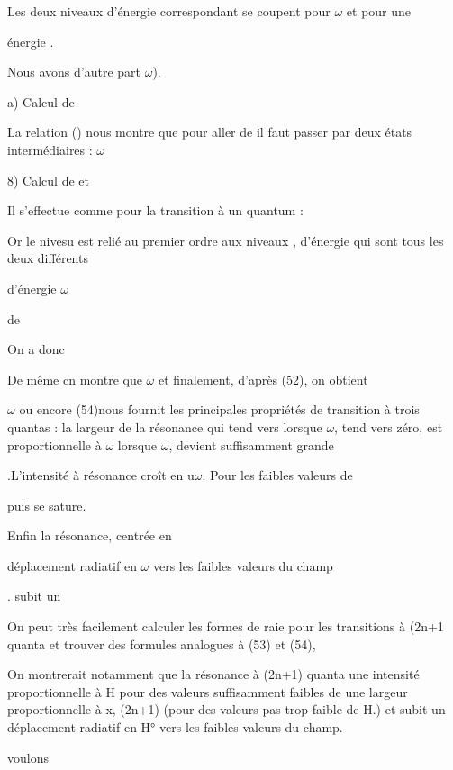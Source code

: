 Les deux niveaux d'énergie correspondant se coupent pour $\omega$ et pour une

énergie .

Nous avons d'autre part $\omega$).

a) Calcul de 

La relation () nous montre que pour aller de 
il faut passer par deux états intermédiaires :
$\omega$

8) Calcul de  et 

Il s'effectue comme pour la transition à un quantum :


Or le nivesu  est relié au premier ordre aux
niveaux , d'énergie  qui sont tous les deux différents

d'énergie $\omega$

de

On a donc

De même cn montre que
$\omega$
et finalement, d'après (52), on obtient

$\omega$
ou encore
(54)nous fournit les principales propriétés de  transition à trois quantas :
la largeur de la résonance  qui tend vers  lorsque
$\omega$, tend vers zéro, est proportionnelle à $\omega$  lorsque $\omega$, devient suffisamment grande


.L'intensité à résonance croît en u$\omega$. Pour les faibles valeurs de

puis se sature.

Enfin la résonance, centrée en 

déplacement radiatif en $\omega$ vers les faibles valeurs du champ

. subit un

On peut très facilement calculer les formes de raie pour les transitions à (2n+1 quanta
et trouver des formules analogues à (53) et (54),

On montrerait notamment que la résonance à (2n+1) quanta  une intensité
proportionnelle à H pour des valeurs suffisamment faibles de  une
largeur proportionnelle à x, (2n+1) (pour des valeurs pas trop faible de H.)
et subit un déplacement radiatif en H° vers les faibles valeurs du champ.

voulons

